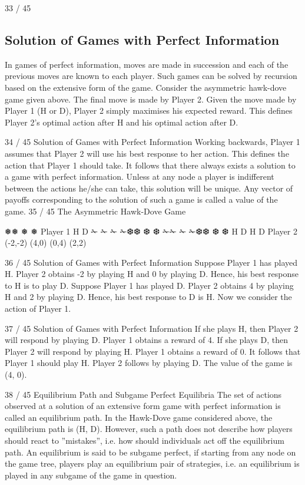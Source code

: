 33 / 45
\subsection{Solution of Games with Perfect Information}
In games of perfect information, moves are made in succession and
each of the previous moves are known to each player.
Such games can be solved by recursion based on the extensive
form of the game.
Consider the asymmetric hawk-dove game given above. The final
move is made by Player 2. Given the move made by Player 1 (H or
D), Player 2 simply maximises his expected reward.
This defines Player 2’s optimal action after H and his optimal
action after D.

34 / 45
Solution of Games with Perfect Information
Working backwards, Player 1 assumes that Player 2 will use his
best response to her action.
This defines the action that Player 1 should take.
It follows that there always exists a solution to a game with perfect
information. Unless at any node a player is indifferent between the
actions he/she can take, this solution will be unique.
Any vector of payoffs corresponding to the solution of such a game
is called a value of the game.
35 / 45
The Asymmetric Hawk-Dove Game



❅❅
❅
❅
Player 1
H D
✁
✁
✁
✁❆❆
❆
❆ ✁✁
✁
✁❆❆
❆
❆
H D H D
Player 2
(-2,-2) (4,0) (0,4) (2,2)

36 / 45
Solution of Games with Perfect Information
Suppose Player 1 has played H. Player 2 obtains -2 by playing H
and 0 by playing D. Hence, his best response to H is to play D.
Suppose Player 1 has played D. Player 2 obtains 4 by playing H
and 2 by playing D. Hence, his best response to D is H.
Now we consider the action of Player 1.

37 / 45
Solution of Games with Perfect Information
If she plays H, then Player 2 will respond by playing D. Player 1
obtains a reward of 4.
If she plays D, then Player 2 will respond by playing H. Player 1
obtains a reward of 0.
It follows that Player 1 should play H. Player 2 follows by playing
D.
The value of the game is (4, 0).

38 / 45
Equilibrium Path and Subgame Perfect Equilibria
The set of actions observed at a solution of an extensive form
game with perfect information is called an equilibrium path.
In the Hawk-Dove game considered above, the equilibrium path is
(H, D).
However, such a path does not describe how players should react to
”mistakes”, i.e. how should individuals act off the equilibrium path.
An equilibrium is said to be subgame perfect, if starting from any
node on the game tree, players play an equilibrium pair of
strategies, i.e. an equilibrium is played in any subgame of the game
in question.

